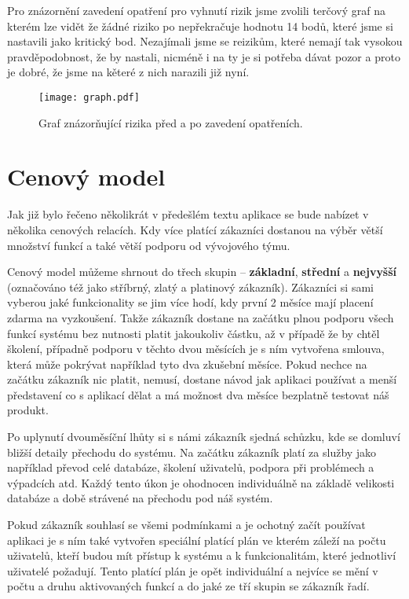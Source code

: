 \par Pro znázornění zavedení opatření pro vyhnutí rizik jsme zvolili terčový graf na kterém lze vidět že žádné riziko po nepřekračuje hodnotu 14 bodů, které jsme si nastavili jako kritický bod. Nezajímali jsme se reizikům, které nemají tak vysokou pravděpodobnost, že by nastali, nicméně i na ty je si potřeba dávat pozor a proto je dobré, že jsme na kěteré z nich narazili již nyní.

\begin{figure}[!htp]
  \centering
  \texttt{[image: graph.pdf]}
  \caption{Graf znázorňující rizika před a po zavedení opatřeních.}
  \label{risk-graph}
\end{figure}

\section{Cenový model}
\par Jak již bylo řečeno několikrát v předešlém textu aplikace se bude nabízet v několika cenových relacích. Kdy více platící zákazníci dostanou na výběr větší množství funkcí a také větší podporu od vývojového týmu.

\par Cenový model můžeme shrnout do třech skupin -- \textbf{základní}, \textbf{střední} a \textbf{nejvyšší} (označováno též jako stříbrný, zlatý a platinový zákazník). Zákazníci si sami vyberou jaké funkcionality se jim více hodí, kdy první 2 měsíce mají placení zdarma na vyzkoušení. Takže zákazník dostane na začátku plnou podporu všech funkcí systému bez nutnosti platit jakoukoliv částku, až v případě že by chtěl školení, případně podporu v těchto dvou měsících je s ním vytvořena smlouva, která může pokrývat například tyto dva zkušební měsíce. Pokud nechce na začátku zákazník nic platit, nemusí, dostane návod jak aplikaci používat a menší představení co s aplikací dělat a má možnost dva měsíce bezplatně testovat náš produkt.

\par Po uplynutí dvouměsíční lhůty si s námi zákazník sjedná schůzku, kde se domluví bližší detaily přechodu do systému. Na začátku zákazník platí za služby jako například převod celé databáze, školení uživatelů, podpora při problémech a výpadcích atd. Každý tento úkon je ohodnocen individuálně na základě velikosti databáze a době strávené na přechodu pod náš systém.

\par Pokud zákazník souhlasí se všemi podmínkami a je ochotný začít používat aplikaci je s ním také vytvořen speciální platící plán ve kterém záleží na počtu uživatelů, kteří budou mít přístup k systému a k funkcionalitám, které jednotliví uživatelé požadují. Tento platící plán je opět individuální a nejvíce se mění v počtu a druhu aktivovaných funkcí a do jaké ze tří skupin se zákazník řadí.

